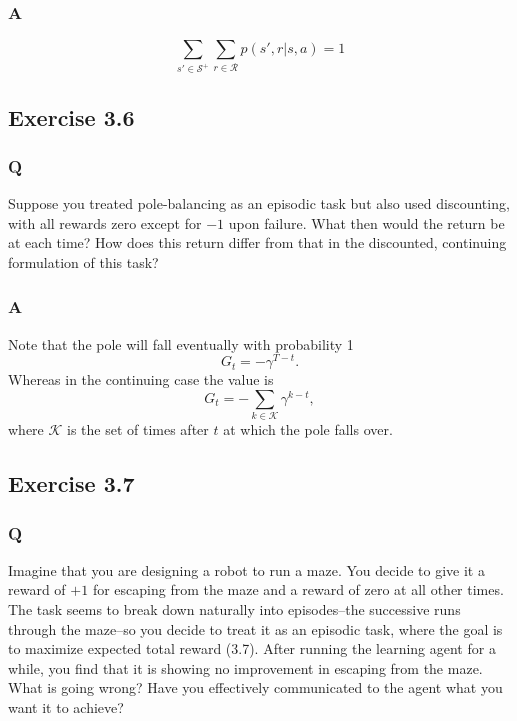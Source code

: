 \subsubsection{A}
\begin{equation}
    \sum_{s' \in \mathcal{S}^{+}} \sum_{r \in \mathcal{R}} p(s', r | s, a) = 1
\end{equation}


\subsection{Exercise 3.6}
\subsubsection{Q}
Suppose you treated pole-balancing as an episodic task but also used discounting, with all rewards zero except for $-1$ upon failure. What then would the return be at each time? How does this return differ from that in the discounted, continuing formulation of this task?

\subsubsection{A}
Note that the pole will fall eventually with probability 1
\begin{equation}
    G_t = - \gamma^{T - t}.
\end{equation}
Whereas in the continuing case the value is
\begin{equation}
    G_t = - \sum_{k \in \mathcal{K}} \gamma^{k - t},
\end{equation}
where $\mathcal{K}$ is the set of times after $t$ at which the pole falls over.

\subsection{Exercise 3.7}
\subsubsection{Q}
Imagine that you are designing a robot to run a maze. You decide to give it a reward of $+1$ for escaping from the maze and a reward of zero at all other times. The task seems to break down naturally into episodes--the successive runs through the maze--so you decide to treat it as an episodic task, where the goal is to maximize expected total reward (3.7). After running the learning agent for a while, you find that it is showing no improvement in escaping from the maze. What is going wrong? Have you effectively communicated to the agent what you want it to achieve?

